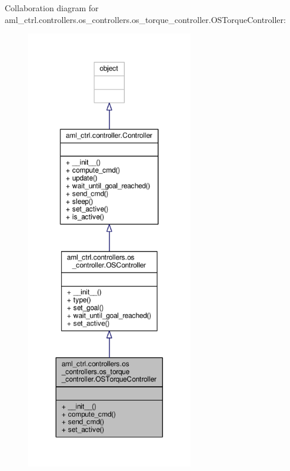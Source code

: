 Collaboration diagram for aml\-\_\-ctrl.\-controllers.\-os\-\_\-controllers.\-os\-\_\-torque\-\_\-controller.\-O\-S\-Torque\-Controller\-:
\nopagebreak
\begin{figure}[H]
\begin{center}
\leavevmode
\includegraphics[height=550pt]{classaml__ctrl_1_1controllers_1_1os__controllers_1_1os__torque__controller_1_1_o_s_torque_controller__coll__graph}
\end{center}
\end{figure}

